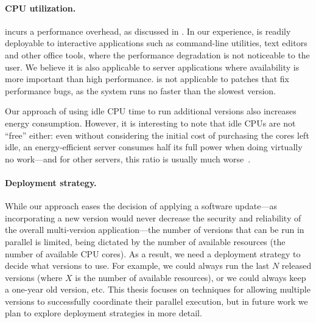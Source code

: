 
\paragraph{CPU utilization.} \mx incurs a performance overhead, as discussed in
.  In our experience, \mx is readily deployable to
interactive applications such as command-line utilities, text editors and other
office tools, where the performance degradation is not noticeable to the user.
We believe it is also applicable to server applications where availability is
more important than high performance.  \mx is not applicable to patches that
fix performance bugs, as the system runs no faster than the slowest
version.

Our approach of using idle CPU time to run additional versions also increases
energy consumption.  However, it is interesting to note that idle CPUs are not
``free'' either: even without considering the initial cost of purchasing the
cores left idle, an energy-efficient server consumes half its full power when
doing virtually no work---and for other servers, this ratio is usually much
worse~\cite{barroso2007}.

\paragraph{Deployment strategy.} While our approach eases the decision of
applying a software update---as incorporating a new version would never
decrease the security and reliability of the overall multi-version
application---the number of versions that can be run in parallel is limited,
being dictated by the number of available resources (\eg the number of
available CPU cores).  As a result, we need a deployment strategy to decide
what versions to use.  For example, we could always run the last $N$ released
versions (where $X$ is the number of available resources), or we could always
keep a one-year old version, etc.  This thesis focuses on techniques for
allowing multiple versions to successfully coordinate their parallel execution,
but in future work we plan to explore deployment strategies in more detail.
